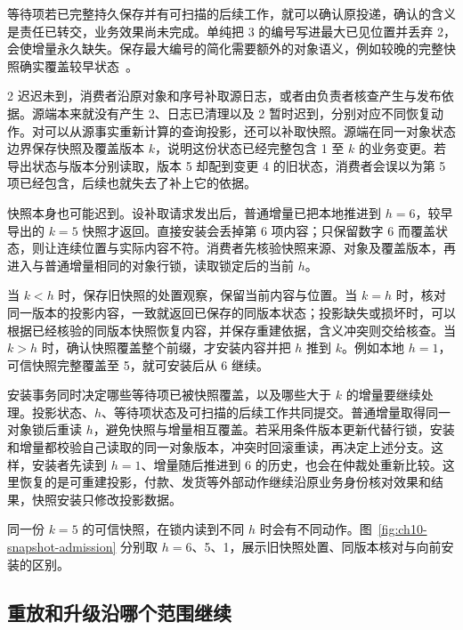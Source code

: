 等待项若已完整持久保存并有可扫描的后续工作，就可以确认原投递，确认的含义是责任已转交，业务效果尚未完成。单纯把 3 的编号写进最大已见位置并丢弃 2，会使增量永久缺失。保存最大编号的简化需要额外的对象语义，例如较晚的完整快照确实覆盖较早状态~\cite{handling-duplicate-messages}。

2 迟迟未到，消费者沿原对象和序号补取源日志，或者由负责者核查产生与发布依据。源端本来就没有产生 2、日志已清理以及 2 暂时迟到，分别对应不同恢复动作。对可以从源事实重新计算的查询投影，还可以补取快照。源端在同一对象状态边界保存快照及覆盖版本 \(k\)，说明这份状态已经完整包含 1 至 \(k\) 的业务变更。若导出状态与版本分别读取，版本 5 却配到变更 4 的旧状态，消费者会误以为第 5 项已经包含，后续也就失去了补上它的依据。

快照本身也可能迟到。设补取请求发出后，普通增量已把本地推进到 \(h=6\)，较早导出的 \(k=5\) 快照才返回。直接安装会丢掉第 6 项内容；只保留数字 6 而覆盖状态，则让连续位置与实际内容不符。消费者先核验快照来源、对象及覆盖版本，再进入与普通增量相同的对象行锁，读取锁定后的当前 \(h\)。

当 \(k<h\) 时，保存旧快照的处置观察，保留当前内容与位置。当 \(k=h\) 时，核对同一版本的投影内容，一致就返回已保存的同版本状态；投影缺失或损坏时，可以根据已经核验的同版本快照恢复内容，并保存重建依据，含义冲突则交给核查。当 \(k>h\) 时，确认快照覆盖整个前缀，才安装内容并把 \(h\) 推到 \(k\)。例如本地 \(h=1\)，可信快照完整覆盖至 5，就可安装后从 6 继续。

安装事务同时决定哪些等待项已被快照覆盖，以及哪些大于 \(k\) 的增量要继续处理。投影状态、\(h\)、等待项状态及可扫描的后续工作共同提交。普通增量取得同一对象锁后重读 \(h\)，避免快照与增量相互覆盖。若采用条件版本更新代替行锁，安装和增量都校验自己读取的同一对象版本，冲突时回滚重读，再决定上述分支。这样，安装者先读到 \(h=1\)、增量随后推进到 6 的历史，也会在仲裁处重新比较。这里恢复的是可重建投影，付款、发货等外部动作继续沿原业务身份核对效果和结果，快照安装只修改投影数据。

同一份 \(k=5\) 的可信快照，在锁内读到不同 \(h\) 时会有不同动作。图~\ref{fig:ch10-snapshot-admission} 分别取 \(h=6\)、5、1，展示旧快照处置、同版本核对与向前安装的区别。



\subsection*{重放和升级沿哪个范围继续}

